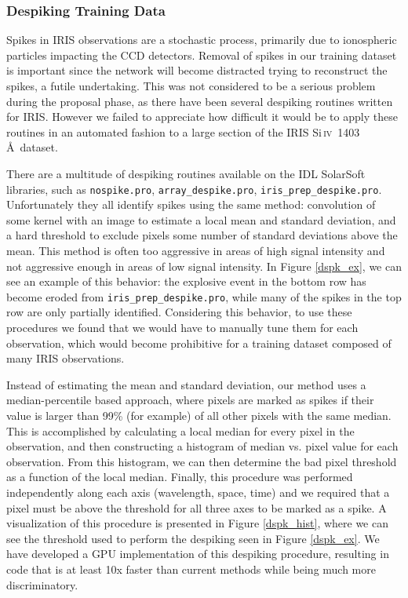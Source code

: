 \documentclass[10pt,letterpaper]{article}
\newcommand{\SiIV}{Si\,\textsc{iv}~1403\,\AA}
\begin{document}
				
							
			\subsubsection{Despiking Training Data}	\label{sec_dspk}
			
				Spikes in IRIS observations are a stochastic process, primarily due to ionospheric particles impacting the CCD detectors.
				Removal of spikes in our training dataset is important since the network will become distracted trying to reconstruct the spikes, a futile undertaking.
				This was not considered to be a serious problem during the proposal phase, as there have been several despiking routines written for IRIS.
				However we failed to appreciate how difficult it would be to apply these routines in an automated fashion to a large section of the IRIS \SiIV\ dataset.
				
				There are a multitude of despiking routines available on the IDL SolarSoft libraries, such as \texttt{nospike.pro}, \texttt{array\_despike.pro}, \texttt{iris\_prep\_despike.pro}.
				Unfortunately they all identify spikes using the same method: convolution of some kernel with an image to estimate a local mean and standard deviation, and a hard threshold to exclude pixels some number of standard deviations above the mean.
				This method is often too aggressive in areas of high signal intensity and not aggressive enough in areas of low signal intensity.
				In Figure \ref{dspk_ex}, we can see an example of this behavior: the explosive event in the bottom row has become eroded from \texttt{iris\_prep\_despike.pro}, while many of the spikes in the top row are only partially identified.
				Considering this behavior, to use these procedures we found that we would have to manually tune them for each observation, which would become prohibitive for a training dataset composed of many IRIS observations.
				
				Instead of estimating the mean and standard deviation, our method uses a median-percentile based approach, where pixels are marked as spikes if their value is larger than 99\% (for example) of all other pixels with the same median. 
				This is accomplished by calculating a local median for every pixel in the observation, and then constructing a histogram of median vs. pixel value for each observation.
				From this histogram, we can then determine the bad pixel threshold as a function of the local median.
				Finally, this procedure was performed independently along each axis (wavelength, space, time) and we required that a pixel must be above the threshold for all three axes to be marked as a spike.
				A visualization of this procedure is presented in Figure \ref{dspk_hist}, where we can see the threshold used to perform the despiking seen in Figure \ref{dspk_ex}.		
				We have developed a GPU implementation of this despiking procedure, resulting in code that is at least 10x faster than current methods while being much more discriminatory.
				
\end{document}
